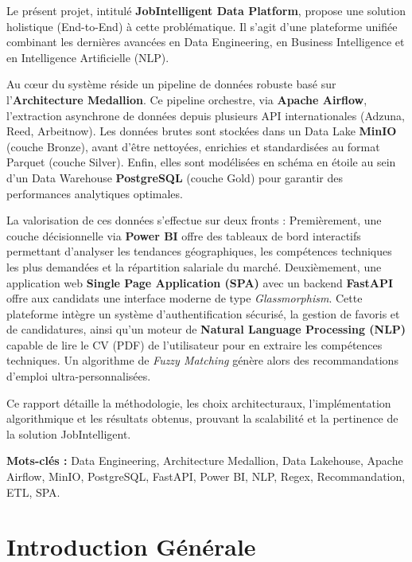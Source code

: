 \documentclass[12pt,a4paper,twoside]{report}
\begin{document}
Le présent projet, intitulé \textbf{JobIntelligent Data Platform}, propose une solution holistique (End-to-End) à cette problématique. Il s'agit d'une plateforme unifiée combinant les dernières avancées en Data Engineering, en Business Intelligence et en Intelligence Artificielle (NLP). 

Au cœur du système réside un pipeline de données robuste basé sur l'\textbf{Architecture Medallion}. Ce pipeline orchestre, via \textbf{Apache Airflow}, l'extraction asynchrone de données depuis plusieurs API internationales (Adzuna, Reed, Arbeitnow). Les données brutes sont stockées dans un Data Lake \textbf{MinIO} (couche Bronze), avant d'être nettoyées, enrichies et standardisées au format Parquet (couche Silver). Enfin, elles sont modélisées en schéma en étoile au sein d'un Data Warehouse \textbf{PostgreSQL} (couche Gold) pour garantir des performances analytiques optimales.

La valorisation de ces données s'effectue sur deux fronts :
Premièrement, une couche décisionnelle via \textbf{Power BI} offre des tableaux de bord interactifs permettant d'analyser les tendances géographiques, les compétences techniques les plus demandées et la répartition salariale du marché.
Deuxièmement, une application web \textbf{Single Page Application (SPA)} avec un backend \textbf{FastAPI} offre aux candidats une interface moderne de type \textit{Glassmorphism}. Cette plateforme intègre un système d'authentification sécurisé, la gestion de favoris et de candidatures, ainsi qu'un moteur de \textbf{Natural Language Processing (NLP)} capable de lire le CV (PDF) de l'utilisateur pour en extraire les compétences techniques. Un algorithme de \textit{Fuzzy Matching} génère alors des recommandations d'emploi ultra-personnalisées.

Ce rapport détaille la méthodologie, les choix architecturaux, l'implémentation algorithmique et les résultats obtenus, prouvant la scalabilité et la pertinence de la solution JobIntelligent.

\textbf{Mots-clés :} Data Engineering, Architecture Medallion, Data Lakehouse, Apache Airflow, MinIO, PostgreSQL, FastAPI, Power BI, NLP, Regex, Recommandation, ETL, SPA.



\tableofcontents
\newpage
\listoffigures
\vspace{1cm}
\listoftables
\newpage

\chapter{Introduction Générale}
\end{document}

